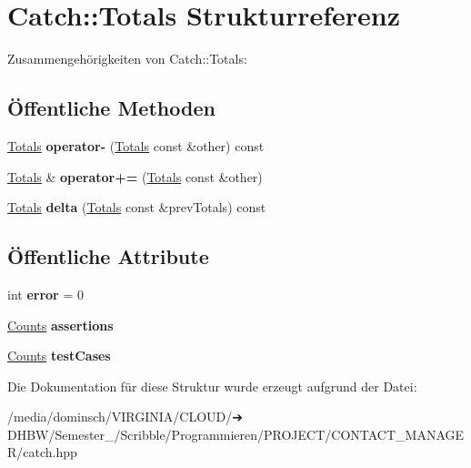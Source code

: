 \hypertarget{structCatch_1_1Totals}{}\section{Catch\+:\+:Totals Strukturreferenz}
\label{structCatch_1_1Totals}


Zusammengehörigkeiten von Catch\+:\+:Totals\+:
\subsection*{Öffentliche Methoden}
\begin{DoxyCompactItemize}
\item 
\mbox{\label{structCatch_1_1Totals_a9279ed39139cb7e7b291918a6d08290e}} 
\hyperlink{structCatch_1_1Totals}{Totals} {\bfseries operator-\/} (\hyperlink{structCatch_1_1Totals}{Totals} const \&other) const
\item 
\mbox{\label{structCatch_1_1Totals_a574015076e54cc405c70b053e3356e43}} 
\hyperlink{structCatch_1_1Totals}{Totals} \& {\bfseries operator+=} (\hyperlink{structCatch_1_1Totals}{Totals} const \&other)
\item 
\mbox{\label{structCatch_1_1Totals_a1a94a654f5f3786b75695e081fc9bca2}} 
\hyperlink{structCatch_1_1Totals}{Totals} {\bfseries delta} (\hyperlink{structCatch_1_1Totals}{Totals} const \&prev\+Totals) const
\end{DoxyCompactItemize}
\subsection*{Öffentliche Attribute}
\begin{DoxyCompactItemize}
\item 
\mbox{\label{structCatch_1_1Totals_a6ea14c7de7ea735a14f172a26e08a239}} 
int {\bfseries error} = 0
\item 
\mbox{\label{structCatch_1_1Totals_a885ded66df752147b30c3d45aa602ec9}} 
\hyperlink{structCatch_1_1Counts}{Counts} {\bfseries assertions}
\item 
\mbox{\label{structCatch_1_1Totals_adb195fe477aedee2ecea88c888f16506}} 
\hyperlink{structCatch_1_1Counts}{Counts} {\bfseries test\+Cases}
\end{DoxyCompactItemize}


Die Dokumentation für diese Struktur wurde erzeugt aufgrund der Datei\+:\begin{DoxyCompactItemize}
\item 
/media/dominsch/\+V\+I\+R\+G\+I\+N\+I\+A/\+C\+L\+O\+U\+D/➔ D\+H\+B\+W/\+Semester\+\_/\+Scribble/\+Programmieren/\+P\+R\+O\+J\+E\+C\+T/\+C\+O\+N\+T\+A\+C\+T\+\_\+\+M\+A\+N\+A\+G\+E\+R/catch.\+hpp\end{DoxyCompactItemize}
